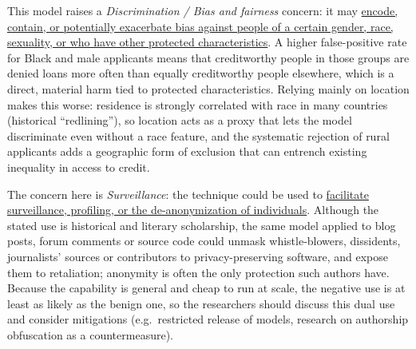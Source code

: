 \begin{solution}
This model raises a \emph{Discrimination / Bias and fairness} concern: it may
\uline{encode, contain, or potentially exacerbate bias against people of a certain gender, race,
sexuality, or who have other protected characteristics}. A higher false-positive rate for Black and male
applicants means that creditworthy people in those groups are denied loans more often than equally creditworthy
people elsewhere, which is a direct, material harm tied to protected characteristics. Relying mainly on
location makes this worse: residence is strongly correlated with race in many countries (historical
``redlining''), so location acts as a proxy that lets the model discriminate even without a race feature, and
the systematic rejection of rural applicants adds a geographic form of exclusion that can entrench existing
inequality in access to credit.
\end{solution}

\begin{solution}
The concern here is \emph{Surveillance}: the technique could be used to
\uline{facilitate surveillance, profiling, or the de-anonymization of individuals}. Although the stated use
is historical and literary scholarship, the same model applied to blog posts, forum comments or source code
could unmask whistle-blowers, dissidents, journalists' sources or contributors to privacy-preserving software,
and expose them to retaliation; anonymity is often the only protection such authors have. Because the
capability is general and cheap to run at scale, the negative use is at least as likely as the benign one,
so the researchers should discuss this dual use and consider mitigations (e.g.\ restricted release of models,
research on authorship obfuscation as a countermeasure).
\end{solution}

